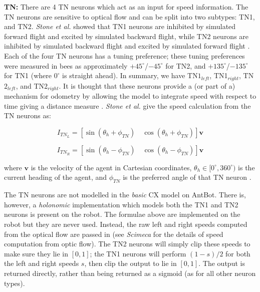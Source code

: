 \documentclass[a4paper,11pt,twoside,openright]{article}
\begin{document}
\textbf{TN:}
There are 4 TN neurons which act as an input for speed information. The TN
neurons are sensitive to optical flow and can be split into two subtypes:
TN1, and TN2. \textit{Stone et al.} showed that TN1 neurons are inhibited by
simulated forward flight and excited by simulated backward flight, while TN2
neurons are inhibited by simulated backward flight and excited by simulated
forward flight \cite{Stone2017}. Each of the four TN neurons has a tuning
preference; these tuning preferences were measured in bees as approximately
$+45^{\circ}$/$-45^{\circ}$ for TN2, and $+135^{\circ}$/$-135^{\circ}$ for TN1
(where $0^{\circ}$ is straight ahead). In summary, we have TN$1_{left}$,
TN1$_{right}$, TN$2_{left}$, and TN$2_{right}$. It is thought that these neurons
provide a (or part of a) mechanism for odometry by allowing the model to
integrate speed with respect to time giving a distance measure \cite{Stone2017}.
\textit{Stone et al.} give the speed calculation from the TN neurons
as:

\begin{equation}
  I_{TN_{L}} =
  [ \sin (\theta_{h} + \phi_{TN}) \quad \cos (\theta_{h} + \phi_{TN}) ]\mathbf{v}
\end{equation}

\begin{equation}
  I_{TN_{R}} =
  [ \sin (\theta_{h} - \phi_{TN}) \quad \cos (\theta_{h} - \phi_{TN}) ]\mathbf{v}
\end{equation}

where $\mathbf{v}$ is the velocity of the agent in Cartesian coordinates,
$\theta_h \in [0^{\circ}, 360^{\circ})$ is the current heading of the agent, and
$\phi_{TN}$ is the preferred angle of that TN neuron \cite{Stone2017}.
\newline
\par

The TN neurons are not modelled in the \textit{basic} CX model on AntBot. There
is, however, a \textit{holonomic} implementation which models both the TN1 and
TN2 neurons is present on the robot. The formulae above are implemented on the
robot but they are never used. Instead, the raw left and right speeds computed
from the optical flow are passed in (see \textit{Scimeca} \cite{Scimeca2017} for
the details of speed computation from optic flow). The TN2 neurons will simply
clip these speeds to make sure they lie in $[0,1]$; the TN1 neurons will perform
$(1 - s) / 2$ for both the left and right speeds $s$, then clip the output to lie
in $[0,1]$. The output is returned directly, rather than being returned as a
sigmoid (as for all other neuron types).
\newline
\par
\end{document}
